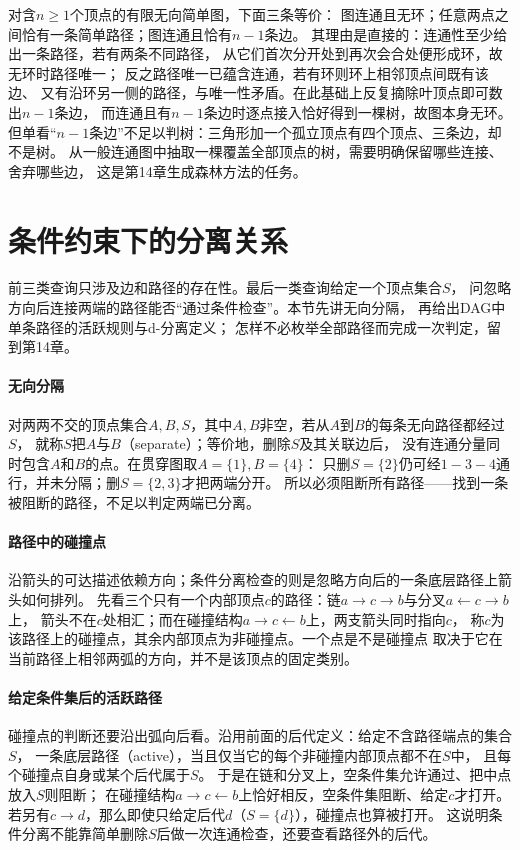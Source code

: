 对含$n\geq1$个顶点的有限无向简单图，下面三条等价：
图连通且无环；任意两点之间恰有一条简单路径；图连通且恰有$n-1$条边。
其理由是直接的：连通性至少给出一条路径，若有两条不同路径，
从它们首次分开处到再次会合处便形成环，故无环时路径唯一；
反之路径唯一已蕴含连通，若有环则环上相邻顶点间既有该边、
又有沿环另一侧的路径，与唯一性矛盾。在此基础上反复摘除叶顶点即可数出$n-1$条边，
而连通且有$n-1$条边时逐点接入恰好得到一棵树，故图本身无环。
但单看“$n-1$条边”不足以判树：三角形加一个孤立顶点有四个顶点、三条边，却不是树。
从一般连通图中抽取一棵覆盖全部顶点的树，需要明确保留哪些连接、舍弃哪些边，
这是第14章生成森林方法的任务。

\section{条件约束下的分离关系}
\label{sec:graph-paths-conditional-separation}

前三类查询只涉及边和路径的存在性。最后一类查询给定一个顶点集合$S$，
问忽略方向后连接两端的路径能否“通过条件检查”。本节先讲无向分隔，
再给出DAG中单条路径的活跃规则与d-分离定义；
怎样不必枚举全部路径而完成一次判定，留到第14章。

\paragraph{无向分隔}
对两两不交的顶点集合$A,B,S$，其中$A,B$非空，若从$A$到$B$的每条无向路径都经过$S$，
就称$S$把$A$与$B$（separate）；等价地，删除$S$及其关联边后，
没有连通分量同时包含$A$和$B$的点。在贯穿图取$A=\{1\},B=\{4\}$：
只删$S=\{2\}$仍可经$1-3-4$通行，并未分隔；删$S=\{2,3\}$才把两端分开。
所以必须阻断所有路径——找到一条被阻断的路径，不足以判定两端已分离。

\paragraph{路径中的碰撞点}
沿箭头的可达描述依赖方向；条件分离检查的则是忽略方向后的一条底层路径上箭头如何排列。
先看三个只有一个内部顶点$c$的路径：链$a\to c\to b$与分叉$a\leftarrow c\to b$上，
箭头不在$c$处相汇；而在碰撞结构$a\to c\leftarrow b$上，两支箭头同时指向$c$，
称$c$为该路径上的碰撞点，其余内部顶点为非碰撞点。一个点是不是碰撞点
取决于它在当前路径上相邻两弧的方向，并不是该顶点的固定类别。

\paragraph{给定条件集后的活跃路径}
碰撞点的判断还要沿出弧向后看。沿用前面的后代定义：给定不含路径端点的集合$S$，
一条底层路径（active），当且仅当它的每个非碰撞内部顶点都不在$S$中，
且每个碰撞点自身或某个后代属于$S$。
于是在链和分叉上，空条件集允许通过、把中点放入$S$则阻断；
在碰撞结构$a\to c\leftarrow b$上恰好相反，空条件集阻断、给定$c$才打开。
若另有$c\to d$，那么即使只给定后代$d$（$S=\{d\}$），碰撞点也算被打开。
这说明条件分离不能靠简单删除$S$后做一次连通检查，还要查看路径外的后代。

